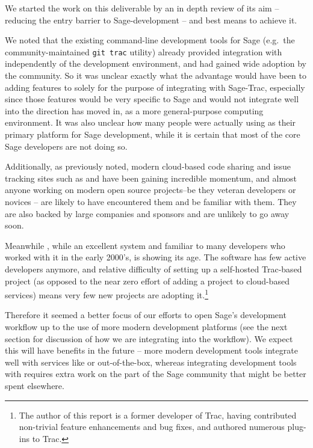 We started the work on this deliverable by an in depth review of its aim --
reducing the entry barrier to Sage-development -- and best means to achieve it.

We noted that the existing command-line development tools for Sage (e.g.~the
community-maintained {\tt git trac} utility) already provided integration with
\Trac independently of the development environment, and had gained wide
adoption by the community. So it was unclear exactly what the advantage would
have been to adding features to \cocalc solely for the purpose of integrating
with Sage-Trac, especially since those features would be very specific to Sage
and would not integrate well into the direction \cocalc has moved in, as a more
general-purpose computing environment.  It was also unclear how many people
were actually using \cocalc as their primary platform for Sage development,
while it is certain that most of the core Sage developers are not doing so.

Additionally, as previously noted, modern cloud-based code sharing and issue
tracking sites such as \GitHub and \GitLab have been gaining incredible
momentum, and almost anyone working on modern open source projects--be they
veteran developers or novices -- are likely to have encountered them and be
familiar with them.  They are also backed by large companies and sponsors and
are unlikely to go away soon.

Meanwhile \Trac, while an excellent system and familiar to many developers who
worked with it in the early 2000's, is showing its age.  The \Trac software has
few active developers anymore, and relative difficulty of setting up a
self-hosted Trac-based project (as opposed to the near zero effort of adding a
project to cloud-based services) means very few new projects are adopting
it.\footnote{The author of this report is a former developer of Trac, having
contributed non-trivial feature enhancements and bug fixes, and authored
numerous plug-ins to Trac.}

Therefore it seemed a better focus of our efforts to open Sage's development
workflow up to the use of more modern development platforms (see the next
section for discussion of how we are integrating \GitLab into the workflow).
We expect this will have benefits in the future -- more modern development tools
integrate well with services like \GitHub or \GitLab out-of-the-box, whereas
integrating development tools with \Trac requires extra work on the part of the Sage
community that might be better spent elsewhere.

